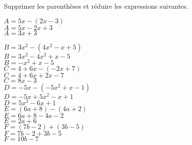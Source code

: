 \begin{corrige}
    Supprimer les parenthèses et réduire les expressions suivantes.    
    \begin{itemize}
        \def\item{}
        \begin{spacing}{1.2}
            \item $A= 5x-(2x-3)$\\
            {\red $A=5x-2x+3$\\$A=3x+3$}
        \end{spacing}
    \end{itemize}
    \Coupe
    \begin{itemize}
        \def\item{}
        \begin{spacing}{1.2}
            \item $B= 3x^2-(4x^2-x+5)$\\
            {\red $B=3x^2-4x^2+x-5$\\$B=-x^2+x-5$\\}
            \item $C= 4+6x-(-2x+7)$\\
            {\red $C=4+6x+2x-7$\\$C=8x-3$}\\
            \columnbreak
            \item $D= -5x-(-5x^2+x-1)$\\
            {\red $D=-5x+5x^2-x+1$\\$D=5x^2-6x+1$}\\
            \item $E= (6a+8)-(4a+2)$\\
            {\red $E=6a+8-4a-2$\\$E=2a+6$}\\
            \item $F= (7b-2)+(3b-5)$\\
            {\red $F=7b-2+3b-5$\\$F=10b-7$}\\
        \end{spacing}
    \end{itemize}
\end{corrige}

